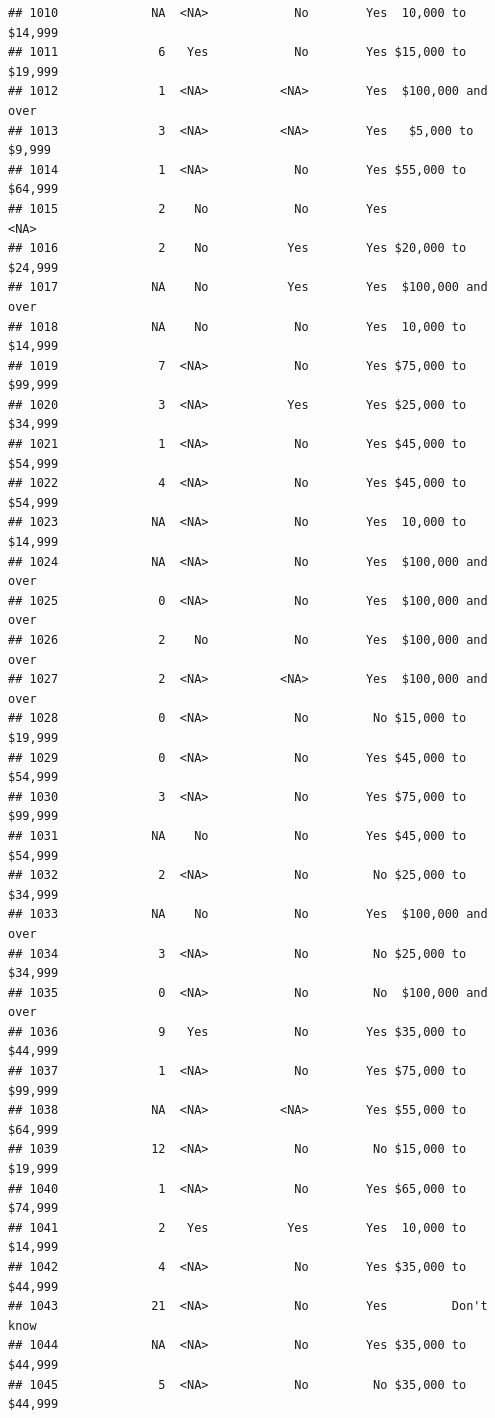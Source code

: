 \documentclass[man]{apa6}
\begin{document}
\begin{verbatim}
## 1010             NA  <NA>            No        Yes  10,000 to $14,999
## 1011              6   Yes            No        Yes $15,000 to $19,999
## 1012              1  <NA>          <NA>        Yes  $100,000 and over
## 1013              3  <NA>          <NA>        Yes   $5,000 to $9,999
## 1014              1  <NA>            No        Yes $55,000 to $64,999
## 1015              2    No            No        Yes               <NA>
## 1016              2    No           Yes        Yes $20,000 to $24,999
## 1017             NA    No           Yes        Yes  $100,000 and over
## 1018             NA    No            No        Yes  10,000 to $14,999
## 1019              7  <NA>            No        Yes $75,000 to $99,999
## 1020              3  <NA>           Yes        Yes $25,000 to $34,999
## 1021              1  <NA>            No        Yes $45,000 to $54,999
## 1022              4  <NA>            No        Yes $45,000 to $54,999
## 1023             NA  <NA>            No        Yes  10,000 to $14,999
## 1024             NA  <NA>            No        Yes  $100,000 and over
## 1025              0  <NA>            No        Yes  $100,000 and over
## 1026              2    No            No        Yes  $100,000 and over
## 1027              2  <NA>          <NA>        Yes  $100,000 and over
## 1028              0  <NA>            No         No $15,000 to $19,999
## 1029              0  <NA>            No        Yes $45,000 to $54,999
## 1030              3  <NA>            No        Yes $75,000 to $99,999
## 1031             NA    No            No        Yes $45,000 to $54,999
## 1032              2  <NA>            No         No $25,000 to $34,999
## 1033             NA    No            No        Yes  $100,000 and over
## 1034              3  <NA>            No         No $25,000 to $34,999
## 1035              0  <NA>            No         No  $100,000 and over
## 1036              9   Yes            No        Yes $35,000 to $44,999
## 1037              1  <NA>            No        Yes $75,000 to $99,999
## 1038             NA  <NA>          <NA>        Yes $55,000 to $64,999
## 1039             12  <NA>            No         No $15,000 to $19,999
## 1040              1  <NA>            No        Yes $65,000 to $74,999
## 1041              2   Yes           Yes        Yes  10,000 to $14,999
## 1042              4  <NA>            No        Yes $35,000 to $44,999
## 1043             21  <NA>            No        Yes         Don't know
## 1044             NA  <NA>            No        Yes $35,000 to $44,999
## 1045              5  <NA>            No         No $35,000 to $44,999

\end{verbatim}
\end{document}
